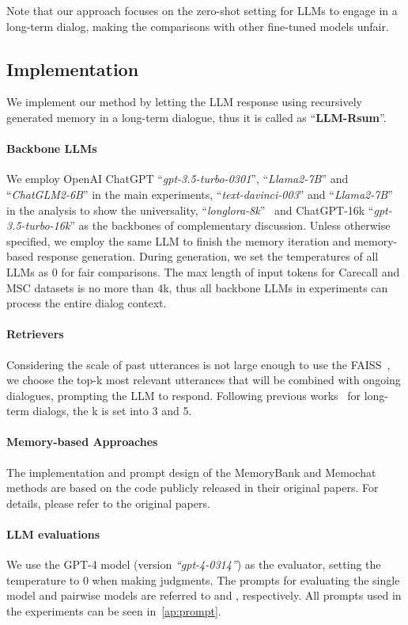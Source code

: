 \documentclass[authoryear,preprint,review,12pt]{elsarticle}
\begin{document}
Note that our approach focuses on the zero-shot setting for LLMs to engage in a long-term dialog, making the comparisons with other fine-tuned models unfair.

\subsection{Implementation}
We implement our method by letting the LLM response using recursively generated memory in a long-term dialogue, thus it is called as ``\textbf{LLM-Rsum}''. 

\paragraph*{Backbone LLMs}We employ OpenAI ChatGPT ``\textit{gpt-3.5-turbo-0301}'', ``\textit{Llama2-7B}'' and ``\textit{ChatGLM2-6B}'' in the main experiments, ``\textit{text-davinci-003}'' and ``\textit{Llama2-7B}''~\citep{llama2} in the analysis to show the universality, ``\textit{longlora-8k}''~\citep{Chen2023LongLoRAEF} and ChatGPT-16k ``\textit{gpt-3.5-turbo-16k}'' as the backbones of complementary discussion. Unless otherwise specified, we employ the same LLM to finish the memory iteration and memory-based response generation. During generation, we set the temperatures of all LLMs as 0 for fair comparisons. The max length of input tokens for Carecall and MSC datasets is no more than 4k, thus all backbone LLMs in experiments can process the entire dialog context. 

\paragraph*{Retrievers} Considering the scale of past utterances is not large enough to use the FAISS~\citep{faiss2019}, we choose the top-k most relevant utterances that will be combined with ongoing dialogues, prompting the LLM to respond. Following previous works~\citep{xu-etal-2022-beyond} for long-term dialogs, the k is set into 3 and 5.
\paragraph*{Memory-based Approaches}The implementation and prompt design of the MemoryBank and Memochat methods are based on the code publicly released in their original papers. For details, please refer to the original papers.
\paragraph*{LLM evaluations} We use the GPT-4 model (version \textit{``gpt-4-0314''}) as the evaluator, setting the temperature to 0 when making judgments. The prompts for evaluating the single model and pairwise models are referred to \citep{Lu2023MemoChatTL} and \citep{Dubois2023AlpacaFarmAS}, respectively. All prompts used in the experiments can be seen in~\ref{ap:prompt}.
\end{document}
